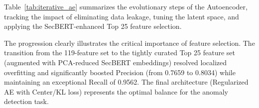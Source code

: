 Table~\ref{tab:iterative_ae} summarizes the evolutionary steps of the Autoencoder, tracking the impact of eliminating data leakage, tuning the latent space, and applying the SecBERT-enhanced Top 25 feature selection.

\begin{table}[H]
    \centering
    \caption{Iterative Performance Progression of the Autoencoder Model}
    \label{tab:iterative_ae}
\end{table}

The progression clearly illustrates the critical importance of feature selection. The transition from the 119-feature set to the tightly curated Top 25 feature set (augmented with PCA-reduced SecBERT embeddings) resolved localized overfitting and significantly boosted Precision (from 0.7659 to 0.8034) while maintaining an exceptional Recall of 0.9562. The final architecture (Regularized AE with Center/KL loss) represents the optimal balance for the anomaly detection task.

